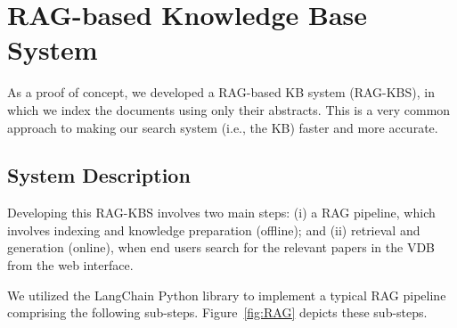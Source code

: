 \documentclass[bdcc,article,submit,pdftex,moreauthors]{Definitions/mdpi}
\begin{document}


\section{RAG-based Knowledge Base System}
\label{sec:KB}

As a proof of concept, we developed a RAG-based KB system (RAG-KBS), in which we index the documents using only their abstracts. This  is a very common approach \cite{aytar2024retrieval} to making our search system (i.e., the KB) faster and more accurate. %

\subsection{System Description}
Developing this RAG-KBS involves two main steps: (i) a RAG pipeline, which involves indexing and knowledge preparation (offline); and (ii) retrieval and generation (online), when end users search for the relevant papers in the VDB from the web interface.

We utilized the LangChain \cite{chase2022langchain} Python library to implement a typical RAG pipeline comprising  the following sub-steps. Figure~\ref{fig:RAG} depicts these sub-steps.
\end{document}
